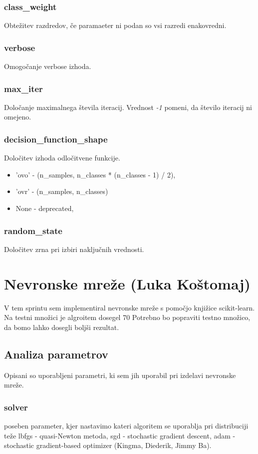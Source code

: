 \documentclass[a4paper,11pt]{article}
\begin{document}
\subsubsection{class_weight}
	Obtežitev razdredov, če paramaeter ni podan so vsi razredi enakovredni.

\subsubsection{verbose}
	Omogočanje verbose izhoda.

\subsubsection{max_iter}
	Določanje maximalnega števila iteracij. Vrednost \textit{-1} pomeni, da število iteracij ni omejeno.

\subsubsection{decision_function_shape}
	Določitev izhoda odločitvene funkcije.
	\begin{itemize}
		\item{'ovo'  - (n_samples, n_classes * (n_classes - 1) / 2),}
		\item{'ovr'  - (n_samples, n_classes) }
		\item{None  - deprecated,}
	\end{itemize}

\subsubsection{random_state}
	Določitev zrna pri izbiri naključnih vrednosti.

\section{Nevronske mreže (Luka Koštomaj)}
V tem sprintu sem implementiral nevronske mreže s pomočjo knjižice scikit-learn.
Na testni množici je algroitem dosegel 70%
Potrebno bo popraviti testno množico, da bomo lahko dosegli boljši rezultat.

\subsection{Analiza parametrov}
	Opisani so uporabljeni parametri, ki sem jih uporabil pri izdelavi nevronske mreže.

	\subsubsection{solver}
		poseben parameter, kjer nastavimo kateri algoritem se uporablja pri distribuciji teže
		lbfgs - quasi-Newton metoda,
		sgd - stochastic gradient descent,
		adam - stochastic gradient-based optimizer (Kingma, Diederik, Jimmy Ba).
\end{document}
